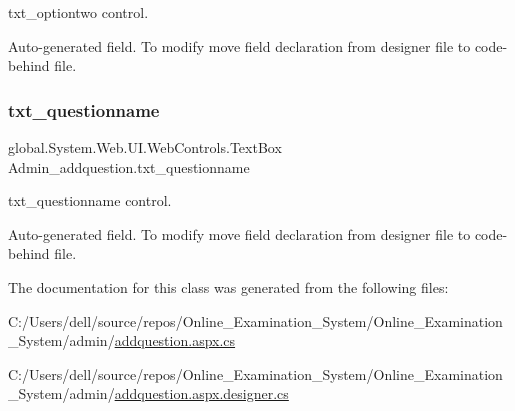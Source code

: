 txt\+\_\+optiontwo control. 

Auto-\/generated field. To modify move field declaration from designer file to code-\/behind file. \mbox{\label{class_admin__addquestion_a901939fe9a1b5f5d33949ca25fe28bfa}} 
\subsubsection{\texorpdfstring{txt\_questionname}{txt\_questionname}}
{\footnotesize\ttfamily global.\+System.\+Web.\+U\+I.\+Web\+Controls.\+Text\+Box Admin\+\_\+addquestion.\+txt\+\_\+questionname\hspace{0.3cm}{\ttfamily [protected]}}



txt\+\_\+questionname control. 

Auto-\/generated field. To modify move field declaration from designer file to code-\/behind file. 

The documentation for this class was generated from the following files\+:\begin{DoxyCompactItemize}
\item 
C\+:/\+Users/dell/source/repos/\+Online\+\_\+\+Examination\+\_\+\+System/\+Online\+\_\+\+Examination\+\_\+\+System/admin/\mbox{\hyperlink{addquestion_8aspx_8cs}{addquestion.\+aspx.\+cs}}\item 
C\+:/\+Users/dell/source/repos/\+Online\+\_\+\+Examination\+\_\+\+System/\+Online\+\_\+\+Examination\+\_\+\+System/admin/\mbox{\hyperlink{addquestion_8aspx_8designer_8cs}{addquestion.\+aspx.\+designer.\+cs}}\end{DoxyCompactItemize}
